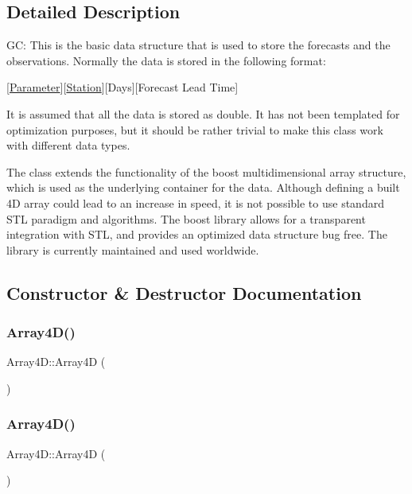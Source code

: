 \subsection{Detailed Description}
GC\+: This is the basic data structure that is used to store the forecasts and the observations. Normally the data is stored in the following format\+:

\mbox{[}\mbox{\hyperlink{class_parameter}{Parameter}}\mbox{]}\mbox{[}\mbox{\hyperlink{class_station}{Station}}\mbox{]}\mbox{[}Days\mbox{]}\mbox{[}Forecast Lead Time\mbox{]}

It is assumed that all the data is stored as double. It has not been templated for optimization purposes, but it should be rather trivial to make this class work with different data types.

The class extends the functionality of the boost multidimensional array structure, which is used as the underlying container for the data. Although defining a built 4D array could lead to an increase in speed, it is not possible to use standard S\+TL paradigm and algorithms. The boost library allows for a transparent integration with S\+TL, and provides an optimized data structure bug free. The library is currently maintained and used worldwide. 

\subsection{Constructor \& Destructor Documentation}
\mbox{\label{class_array4_d_a1bc84c0dcc22ed0e218040b01f56b816}} 
\subsubsection{\texorpdfstring{Array4\+D()}{Array4D()}\hspace{0.1cm}{\footnotesize\ttfamily [1/5]}}
{\footnotesize\ttfamily Array4\+D\+::\+Array4D (\begin{DoxyParamCaption}{ }\end{DoxyParamCaption})}

\mbox{\label{class_array4_d_a71a55de20984154a6b7e31eec8993a24}} 
\subsubsection{\texorpdfstring{Array4\+D()}{Array4D()}\hspace{0.1cm}{\footnotesize\ttfamily [2/5]}}
{\footnotesize\ttfamily Array4\+D\+::\+Array4D (\begin{DoxyParamCaption}\item[{const \mbox{\hyperlink{class_array4_d}{Array4D}} \&}]{ }\end{DoxyParamCaption})\hspace{0.3cm}{\ttfamily [delete]}}

